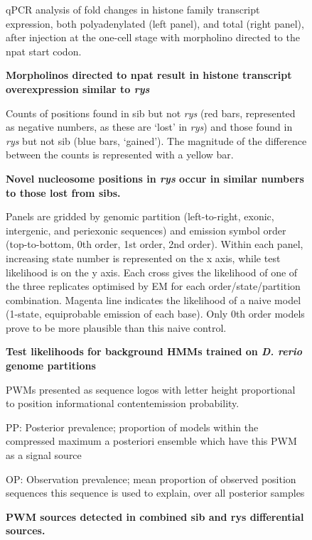 \begin{figure}[!h]
    \caption{{\bf Morpholinos directed to npat result in histone transcript overexpression similar to \textit{rys}}}
    qPCR analysis of fold changes in histone family transcript expression, both polyadenylated (left panel), and total (right panel), after injection at the one-cell stage with morpholino directed to the npat start codon.
    \label{morpholinoRTPCR}
\end{figure}

\begin{figure}[!h]
    \caption{{\bf Novel nucleosome positions in \textit{rys} occur in similar numbers to those lost from sibs.}}
    Counts of positions found in sib but not \textit{rys} (red bars, represented as negative numbers, as these are `lost' in \textit{rys}) and those found in \textit{rys} but not sib (blue bars, `gained'). The magnitude of the difference between the counts is represented with a yellow bar.
    \label{diffposdist}
\end{figure}

\begin{figure}[!h]
    \caption{{\bf Test likelihoods for background HMMs trained on \textit{D. rerio} genome partitions}}
    Panels are gridded by genomic partition (left-to-right, exonic, intergenic, and periexonic sequences) and emission symbol order (top-to-bottom, 0th order, 1st order, 2nd order). Within each panel, increasing state number is represented on the x axis, while test likelihood is on the y axis. Each cross gives the likelihood of one of the three replicates optimised by EM for each order/state/partition combination. Magenta line indicates the likelihood of a naive model (1-state, equiprobable emission of each base). Only 0th order models prove to be more plausible than this naive control.
    \label{BHMMlh}
\end{figure}

\begin{figure}[!h]
    \caption{{\bf PWM sources detected in combined sib and rys differential sources.}}
    PWMs presented as sequence logos with letter height proportional to position informational content\/emission probability.
    
    PP: Posterior prevalence; proportion of models within the compressed maximum a posteriori ensemble which have this PWM as a signal source

    OP: Observation prevalence; mean proportion of observed position sequences this sequence is used to explain, over all posterior samples
    \label{combinedmotifs}
\end{figure}

